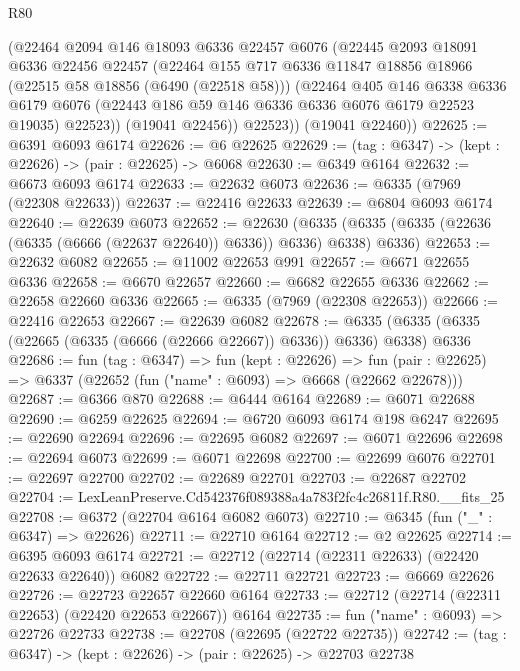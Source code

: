 \begin{lexlean}{R80}
\begin{coremodule}
        (@22464
          @2094
          @146
          @18093
          @6336
          @22457
          @6076
          (@22445
            @2093
            @18091
            @6336
            @22456
            @22457
            (@22464
              @155
              @717
              @6336
              @11847
              @18856
              @18966
              (@22515 @58 @18856 (@6490 (@22518 @58)))
              (@22464
                @405
                @146
                @6338
                @6336
                @6179
                @6076
                (@22443 @186 @59 @146 @6336 @6336 @6076 @6179 @22523 @19035)
                @22523))
            (@19041 @22456))
          @22523))
      (@19041 @22460))
@22625 := @6391 @6093 @6174
@22626 := @6 @22625
@22629 := (tag : @6347) -> (kept : @22626) -> (pair : @22625) -> @6068
@22630 := @6349 @6164
@22632 := @6673 @6093 @6174
@22633 := @22632 @6073
@22636 := @6335 (@7969 (@22308 @22633))
@22637 := @22416 @22633
@22639 := @6804 @6093 @6174
@22640 := @22639 @6073
@22652 := @22630
    (@6335 (@6335 (@6335 (@22636 (@6335 (@6666 (@22637 @22640)) @6336)) @6336) @6338) @6336)
@22653 := @22632 @6082
@22655 := @11002 @22653 @991
@22657 := @6671 @22655 @6336
@22658 := @6670 @22657
@22660 := @6682 @22655 @6336
@22662 := @22658 @22660 @6336
@22665 := @6335 (@7969 (@22308 @22653))
@22666 := @22416 @22653
@22667 := @22639 @6082
@22678 := @6335 (@6335 (@6335 (@22665 (@6335 (@6666 (@22666 @22667)) @6336)) @6336) @6338) @6336
@22686 := fun (tag : @6347) =>
  fun (kept : @22626) =>
  fun (pair : @22625) => @6337 (@22652 (fun ("name" : @6093) => @6668 (@22662 @22678)))
@22687 := @6366 @870
@22688 := @6444 @6164
@22689 := @6071 @22688
@22690 := @6259 @22625
@22694 := @6720 @6093 @6174 @198 @6247
@22695 := @22690 @22694
@22696 := @22695 @6082
@22697 := @6071 @22696
@22698 := @22694 @6073
@22699 := @6071 @22698
@22700 := @22699 @6076
@22701 := @22697 @22700
@22702 := @22689 @22701
@22703 := @22687 @22702
@22704 := LexLeanPreserve.Cd542376f089388a4a783f2fc4c26811f.R80.__fits_25
@22708 := @6372 (@22704 @6164 @6082 @6073)
@22710 := @6345 (fun ("_" : @6347) => @22626)
@22711 := @22710 @6164
@22712 := @2 @22625
@22714 := @6395 @6093 @6174
@22721 := @22712 (@22714 (@22311 @22633) (@22420 @22633 @22640)) @6082
@22722 := @22711 @22721
@22723 := @6669 @22626
@22726 := @22723 @22657 @22660 @6164
@22733 := @22712 (@22714 (@22311 @22653) (@22420 @22653 @22667)) @6164
@22735 := fun ("name" : @6093) => @22726 @22733
@22738 := @22708 (@22695 (@22722 @22735))
@22742 := (tag : @6347) -> (kept : @22626) -> (pair : @22625) -> @22703 @22738

\end{coremodule}
\end{lexlean}

